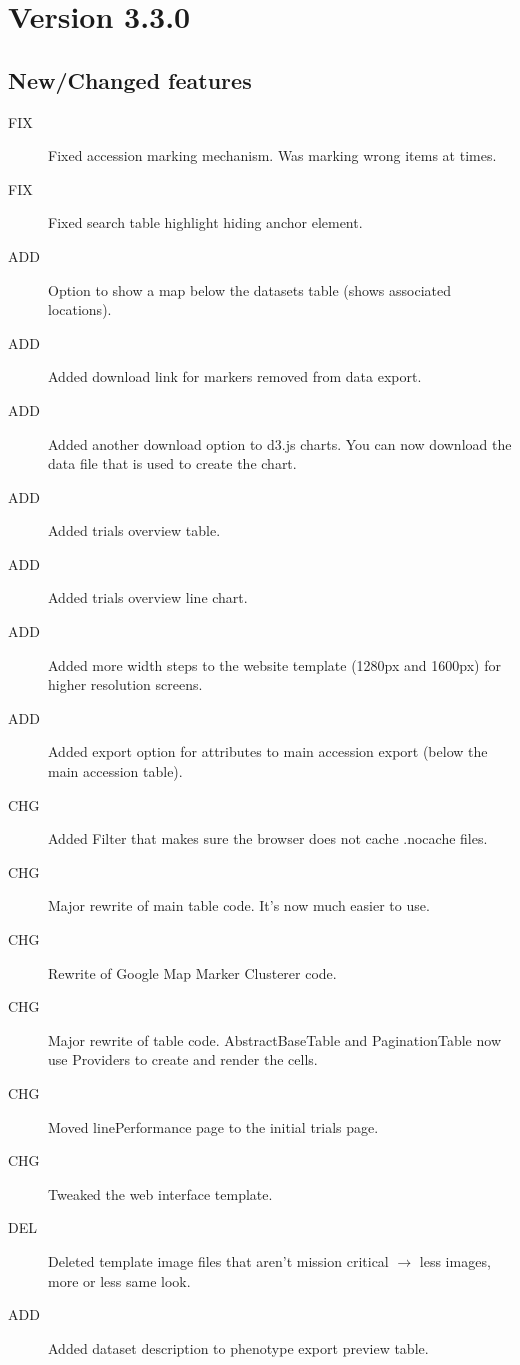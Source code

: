 \section{Version 3.3.0}
\label{sec:3.3.0}

\subsection{New/Changed features}
\begin{description}
	  \item[FIX] Fixed accession marking mechanism. Was marking wrong items at times.
	  \item[FIX] Fixed search table highlight hiding anchor element.
	  \item[ADD] Option to show a map below the datasets table (shows associated locations).
	  \item[ADD] Added download link for markers removed from data export.
	  \item[ADD] Added another download option to d3.js charts. You can now download the data file that is used to create the chart.
	  \item[ADD] Added trials overview table.
	  \item[ADD] Added trials overview line chart.
	  \item[ADD] Added more width steps to the website template (1280px and 1600px) for higher resolution screens.
	  \item[ADD] Added export option for attributes to main accession export (below the main accession table).
 	  \item[CHG] Added Filter that makes sure the browser does not cache .nocache files.
	  \item[CHG] Major rewrite of main table code. It's now much easier to use.
	  \item[CHG] Rewrite of Google Map Marker Clusterer code.
	  \item[CHG] Major rewrite of table code. AbstractBaseTable and PaginationTable now use Providers to create and render the cells.
	  \item[CHG] Moved linePerformance page to the initial trials page.
	  \item[CHG] Tweaked the web interface template.
	  \item[DEL] Deleted template image files that aren't mission critical $\rightarrow$ less images, more or less same look.
	  \item[ADD] Added dataset description to phenotype export preview table.

\end{description}
